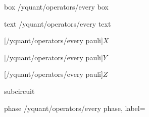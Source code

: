 \protected\long{}

\yquant@langhelper@declare@command%
   {box}%
   \yquant@register@get@allowmultitrue%
   {%
      \expandafter\yquant@prepare%
         \expandafter{\yquant@lang@attr@value}%
         {/yquant/operators/every box}%
   }

\yquant@langhelper@declare@command%
   {text}%
   \yquant@register@get@allowmultitrue%
   {%
      \expandafter\yquant@prepare%
         \expandafter{\yquant@lang@attr@value}%
         {/yquant/operators/every text}%
   }


[/yquant/operators/every pauli]{$X$}

[/yquant/operators/every pauli]{$Y$}

[/yquant/operators/every pauli]{$Z$}

\yquant@langhelper@declare@command%
   {subcircuit}%
   \yquant@register@get@multiaslist%
   {%
      \let\yquant@circuit@subcircuit@content=\yquant@lang@attr@value%
   }

\yquant@langhelper@declare@command%
   {phase}%
   {}%
   {%
      \edef\@yquant@cmd{%
         \yquant@prepare%
            {}%
            {/yquant/operators/every phase, label={\unexpanded\expandafter{\yquant@lang@attr@value}}}%
      }%
      \@yquant@cmd%
   }
%

